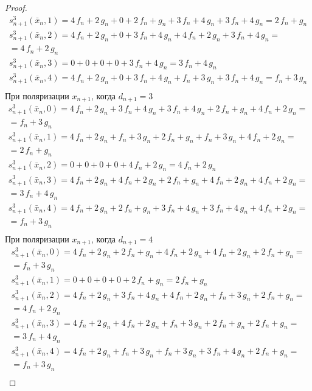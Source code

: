 \documentclass[bibliography=totoc, a4paper, 14pt]{extarticle}
\begin{document}
\begin{proof}
$$\begin{array}{l}
s_{n+1}^3(\bar{x}_n, 1) = 4\,f_n + 2\,g_n + 0 + 2\,f_n + g_n + 3\,f_n + 4\,g_n + 3\,f_n + 4\,g_n = 2\,f_n + g_n \\
s_{n+1}^3(\bar{x}_n, 2) = 4\,f_n + 2\,g_n + 0 + 3\,f_n + 4\,g_n + 4\,f_n + 2\,g_n + 3\,f_n + 4\,g_n =\\
= 4\,f_n + 2\,g_n \\
s_{n+1}^3(\bar{x}_n, 3) = 0 + 0 + 0 + 0 + 3\,f_n + 4\,g_n = 3\,f_n + 4\,g_n \\
s_{n+1}^3(\bar{x}_n, 4) = 4\,f_n + 2\,g_n + 0 + 3\,f_n + 4\,g_n + f_n + 3\,g_n + 3\,f_n + 4\,g_n = f_n + 3\,g_n \\
\end{array}$$
При поляризации $x_{n+1}$, когда $d_{n+1} = 3$
$$\begin{array}{l}
s_{n+1}^3(\bar{x}_n, 0) = 4\,f_n + 2\,g_n + 3\,f_n + 4\,g_n + 3\,f_n + 4\,g_n + 2\,f_n + g_n + 4\,f_n + 2\,g_n =\\
= f_n + 3\,g_n \\
s_{n+1}^3(\bar{x}_n, 1) = 4\,f_n + 2\,g_n + f_n + 3\,g_n + 2\,f_n + g_n + f_n + 3\,g_n + 4\,f_n + 2\,g_n =\\
= 2\,f_n + g_n \\
s_{n+1}^3(\bar{x}_n, 2) = 0 + 0 + 0 + 0 + 4\,f_n + 2\,g_n = 4\,f_n + 2\,g_n \\
s_{n+1}^3(\bar{x}_n, 3) = 4\,f_n + 2\,g_n + 4\,f_n + 2\,g_n + 2\,f_n + g_n + 4\,f_n + 2\,g_n + 4\,f_n + 2\,g_n =\\
= 3\,f_n + 4\,g_n \\
s_{n+1}^3(\bar{x}_n, 4) = 4\,f_n + 2\,g_n + 2\,f_n + g_n + 3\,f_n + 4\,g_n + 3\,f_n + 4\,g_n + 4\,f_n + 2\,g_n =\\
= f_n + 3\,g_n \\
\end{array}$$
При поляризации $x_{n+1}$, когда $d_{n+1} = 4$
$$\begin{array}{l}
s_{n+1}^3(\bar{x}_n, 0) = 4\,f_n + 2\,g_n + 2\,f_n + g_n + 4\,f_n + 2\,g_n + 4\,f_n + 2\,g_n + 2\,f_n + g_n =\\
= f_n + 3\,g_n \\
s_{n+1}^3(\bar{x}_n, 1) = 0 + 0 + 0 + 0 + 2\,f_n + g_n = 2\,f_n + g_n \\
s_{n+1}^3(\bar{x}_n, 2) = 4\,f_n + 2\,g_n + 3\,f_n + 4\,g_n + 4\,f_n + 2\,g_n + f_n + 3\,g_n + 2\,f_n + g_n =\\
= 4\,f_n + 2\,g_n \\
s_{n+1}^3(\bar{x}_n, 3) = 4\,f_n + 2\,g_n + 4\,f_n + 2\,g_n + f_n + 3\,g_n + 2\,f_n + g_n + 2\,f_n + g_n =\\
= 3\,f_n + 4\,g_n \\
s_{n+1}^3(\bar{x}_n, 4) = 4\,f_n + 2\,g_n + f_n + 3\,g_n + f_n + 3\,g_n + 3\,f_n + 4\,g_n + 2\,f_n + g_n =\\
= f_n + 3\,g_n \\
\end{array}$$

\end{proof}
\end{document}
